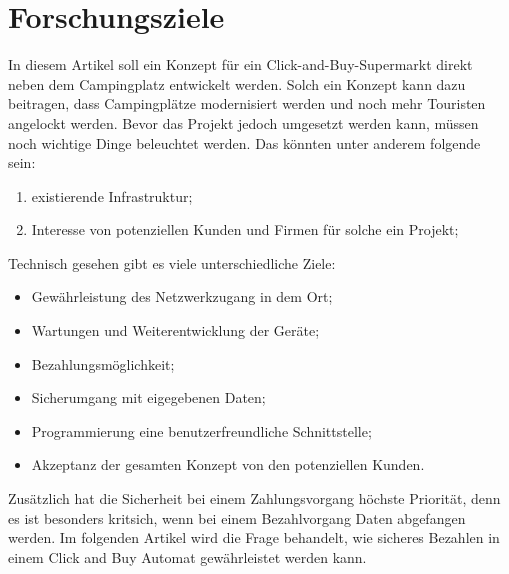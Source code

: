 \section{Forschungsziele}


In diesem Artikel soll ein Konzept für ein Click-and-Buy-Supermarkt direkt neben dem Campingplatz 
entwickelt werden. Solch ein Konzept kann dazu beitragen, dass Campingplätze modernisiert werden 
und noch mehr Touristen angelockt werden. Bevor das Projekt jedoch umgesetzt werden kann, müssen 
noch wichtige Dinge beleuchtet werden. Das könnten unter anderem folgende sein:

\begin{enumerate}
    \item existierende Infrastruktur;
    \item Interesse von potenziellen Kunden und Firmen für solche ein Projekt;
\end{enumerate}


Technisch gesehen gibt es viele unterschiedliche Ziele:
\begin{itemize}
    \item Gewährleistung des Netzwerkzugang in dem Ort;
    \item Wartungen und Weiterentwicklung der Geräte;
    \item Bezahlungsmöglichkeit;
    \item Sicherumgang mit eigegebenen Daten;
    \item Programmierung eine benutzerfreundliche Schnittstelle;
    \item Akzeptanz der gesamten Konzept von den potenziellen Kunden.
\end{itemize}

Zusätzlich hat die Sicherheit bei einem Zahlungsvorgang höchste Priorität, denn es ist besonders kritsich, 
wenn bei einem Bezahlvorgang Daten abgefangen werden. Im folgenden Artikel wird die Frage behandelt, 
wie sicheres Bezahlen in einem Click and Buy Automat gewährleistet werden kann.

%
%
%
%

%
%
%
%
%